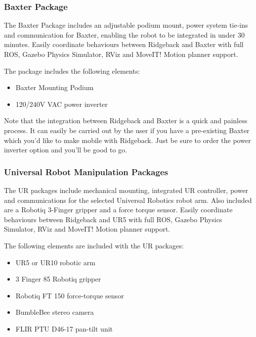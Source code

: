 \documentclass[]{clearpath-latex/clearpath-manual}
\begin{document}
\subsubsection{Baxter Package}

The Baxter Package includes an adjustable podium mount, power system tie-ins and communication for Baxter, enabling the robot to be integrated in under 30 minutes. Easily coordinate behaviours between Ridgeback and Baxter with full ROS, Gazebo Physics Simulator, RViz and MoveIT! Motion planner support.

The package includes the following elements:

\begin{itemize}[nolistsep]
	\item Baxter Mounting Podium
	\item 120/240V VAC power inverter
\end{itemize}

Note that the integration between Ridgeback and Baxter is a quick and painless process. It can easily be carried out by the user if you have a pre-existing Baxter which you'd like to make mobile with Ridgeback. Just be sure to order the power inverter option and you'll be good to go.

\subsubsection{Universal Robot Manipulation Packages}

The UR packages include mechanical mounting, integrated UR controller, power and communications for the selected Universal Robotics robot arm. Also included are a Robotiq 3-Finger gripper and a force torque sensor. Easily coordinate behaviours between Ridgeback and UR5 with full ROS, Gazebo Physics Simulator, RViz and MoveIT! Motion planner support.

The following elements are included with the UR packages:

\begin{itemize}[nolistsep]
	\item UR5 or UR10 robotic arm
	\item 3 Finger 85 Robotiq gripper
	\item Robotiq FT 150 force-torque sensor
	\item BumbleBee stereo camera
	\item FLIR PTU D46-17 pan-tilt unit
\end{itemize}

\pagebreak[0]
\end{document}
